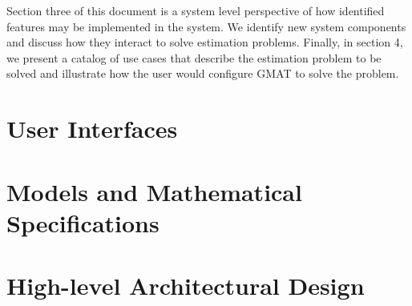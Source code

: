 \documentclass[letterpaper,10pt]{book}
\begin{document}
Section three of this document is a system level perspective of how
identified features may be implemented in the system.  We identify
new system components and discuss how they interact to solve
estimation problems.    Finally, in section 4, we present a catalog
of use cases that describe the estimation problem to be solved and
illustrate how the user would configure GMAT to solve the problem.

\chapter{User Interfaces}
    
    
    
    
    
    
    

\chapter{Models and Mathematical Specifications}
    
    
    
    
    

\chapter{High-level Architectural Design}
    
    
    
    
    
    


\end{document}
